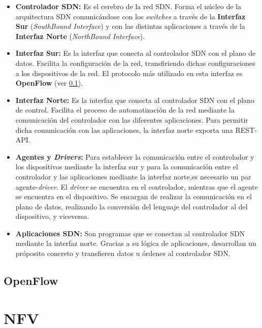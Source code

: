 \begin{itemize}
	\item \textbf{Controlador SDN:} Es el cerebro de la red SDN. Forma el núcleo de la arquitectura SDN comunicándose con los \textit{switches} a través de la \textbf{Interfaz Sur} (\textit{SouthBound Interface}) y con las distintas aplicaciones a través de la \textbf{Interfaz Norte} (\textit{NorthBound Interface}).
	
	\item \textbf{Interfaz Sur:} Es la interfaz que conecta al controlador SDN con el plano de datos. Facilita la configuración de la red, transfiriendo dichas configuraciones a los dispositivos de la red. El protocolo más utilizado en esta interfaz es \textbf{OpenFlow} (ver \ref{subsec:openflow}).
	
	\item \textbf{Interfaz Norte:} Es la interfaz que conecta al controlador SDN con el plano de control. Facilita el proceso de automatización de la red mediante la comunicación del controlador con las diferentes aplicaciones. Para permitir dicha comunicación con las aplicaciones, la interfaz norte exporta una REST-API.
	
	\item \textbf{Agentes y \textit{Drivers}:} Para establecer la comunicación entre el controlador y los dispositivos mediante la interfaz sur y para la comunicación entre el controlador y las aplicaciones mediante la interfaz norte,es necesario un par agente-\textit{driver}. El \textit{driver} se encuentra en el controlador, mientras que el agente se encuentra en el dispositivo. Se encargan de realizar la comunicación en el plano de datos, realizando la conversión del lenguaje del controlador al del dispositivo, y viceversa.
	
	\item \textbf{Aplicaciones SDN:} Son programas que se conectan al controlador SDN mediante la interfaz norte. Gracias a su lógica de aplicaciones, desarrollan un próposito concreto y transfieren datos u órdenes al controlador SDN.
\end{itemize}


\subsection{OpenFlow}
\label{subsec:openflow}

\section{NFV}
\label{sec:nfv}


\cleardoublepage